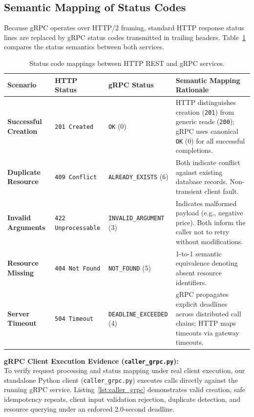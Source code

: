 \documentclass[11pt,a4paper]{article}
\begin{document}
\subsection{Semantic Mapping of Status Codes}
Because gRPC operates over HTTP/2 framing, standard HTTP response status lines are replaced by gRPC status codes transmitted in trailing headers. Table~\ref{tab:status_codes} compares the status semantics between both services.

\begin{table}[h!]
\centering
\small
\renewcommand{\arraystretch}{1.25}
\begin{tabularx}{\textwidth}{p{2.8cm} p{2.2cm} p{3.2cm} X}
\toprule
\textbf{Scenario} & \textbf{HTTP Status} & \textbf{gRPC Status} & \textbf{Semantic Mapping Rationale} \\
\midrule
\textbf{Successful Creation} & \texttt{201 Created} & \texttt{OK} (0) & HTTP distinguishes creation (\texttt{201}) from generic reads (\texttt{200}); gRPC uses canonical \texttt{OK} (0) for all successful completions. \\
\textbf{Duplicate Resource} & \texttt{409 Conflict} & \texttt{ALREADY\_EXISTS} (6) & Both indicate conflict against existing database records. Non-transient client fault. \\
\textbf{Invalid Arguments} & \texttt{422 Unprocessable} & \texttt{INVALID\_ARGUMENT} (3) & Indicates malformed payload (e.g., negative price). Both inform the caller not to retry without modifications. \\
\textbf{Resource Missing} & \texttt{404 Not Found} & \texttt{NOT\_FOUND} (5) & 1-to-1 semantic equivalence denoting absent resource identifiers. \\
\textbf{Server Timeout} & \texttt{504 Timeout} & \texttt{DEADLINE\_EXCEEDED} (4) & gRPC propagates explicit deadlines across distributed call chains; HTTP maps timeouts via gateway timeouts. \\
\bottomrule
\end{tabularx}
\caption{Status code mappings between HTTP REST and gRPC services.}
\label{tab:status_codes}
\end{table}

\noindent\textbf{gRPC Client Execution Evidence (\texttt{caller\_grpc.py}):}\\
To verify request processing and status mapping under real client execution, our standalone Python client (\texttt{caller\_grpc.py}) executes calls directly against the running gRPC service. Listing~\ref{lst:caller_grpc} demonstrates valid creation, safe idempotency repeats, client input validation rejection, duplicate detection, and resource querying under an enforced 2.0-second deadline.
\end{document}
